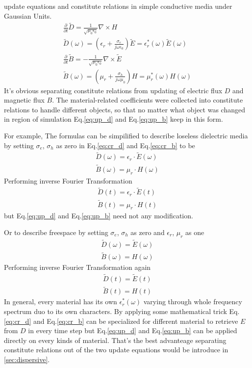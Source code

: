 update equations and constitute relations in simple conductive media under Gaussian Units.
\begin{gather}
  \frac{\partial}{\partial t}\widetilde{D} = \frac{1}{\sqrt{\mu_0\epsilon_0}}\nabla\times H\label{eq:up_d}\\
  \widetilde{D}(\omega) = \left(\epsilon_r + \frac{\sigma_e}{j\omega\epsilon_0}\right)\widetilde{E} = \epsilon_r^*(\omega)\widetilde{E}(\omega)\label{eq:cr_d}\\
  \frac{\partial}{\partial t}\widetilde{B} = -\frac{1}{\sqrt{\mu_0\epsilon_0}}\nabla\times\widetilde{E}\label{eq:up_b}\\
  \widetilde{B}(\omega) = \left(\mu_r + \frac{\sigma_h}{j\omega\mu_0}\right)H = \mu_r^*(\omega)H(\omega)\label{eq:cr_b}
\end{gather}
It's obvious separating constitute relations from updating of electric flux $D$ and magnetic flux $B$. The
material-related coefficients were collected into constitute relations to handle different objects, so that no matter
what object was changed in region of simulation Eq.\ref{eq:up_d} and Eq.\ref{eq:up_b} keep in this form.

For example, The formulas can be simpilified to describe loseless dielectric media by setting $\sigma_e$, $\sigma_h$ as
zero in Eq.\ref{eq:cr_d} and Eq.\ref{eq:cr_b} to be
\begin{gather*}
  \widetilde{D}(\omega) = \epsilon_r\cdot\widetilde{E}(\omega)\\
  \widetilde{B}(\omega) = \mu_r\cdot H(\omega)
\end{gather*}
Performing inverse Fourier Transformation
\begin{gather*}
  \widetilde{D}(t) = \epsilon_r\cdot\widetilde{E}(t)\\
  \widetilde{B}(t) = \mu_r\cdot H(t)
\end{gather*}
but Eq.\ref{eq:up_d} and Eq.\ref{eq:up_b} need not any modification.

Or to describe freespace by setting $\sigma_e$, $\sigma_h$ as zero and $\epsilon_r$, $\mu_r$ as one 
\begin{gather*}
  \widetilde{D}(\omega) = \widetilde{E}(\omega)\\
  \widetilde{B}(\omega) = H(\omega)
\end{gather*}
Performing inverse Fourier Transformation again
\begin{gather*}
  \widetilde{D}(t) = \widetilde{E}(t)\\
  \widetilde{B}(t) = H(t)
\end{gather*}
In general, every material has its own $\epsilon_r^*(\omega)$ varying through whole frequency spectrum duo to its own
characters. By applying some mathematical trick Eq.\ref{eq:cr_d} and Eq.\ref{eq:cr_b} can be specialized for different
material to retrieve $E$ from $D$ in every time step but Eq.\ref{eq:up_d} and Eq.\ref{eq:up_b} can be applied directly
on every kinds of material. That's the best advanteage separating constitute relations out of the two update equations
would be introduce in \ref{sec:dispersive}.

